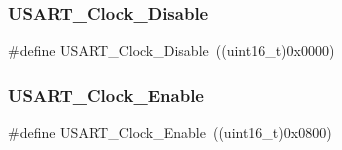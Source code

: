 \subsubsection{\texorpdfstring{USART\_Clock\_Disable}{USART\_Clock\_Disable}}
{\footnotesize\ttfamily \#define U\+S\+A\+R\+T\+\_\+\+Clock\+\_\+\+Disable~((uint16\+\_\+t)0x0000)}

\mbox{\label{group___u_s_a_r_t___clock_gacfe029e2ec4f49ddde031fd031654caa}} 
\subsubsection{\texorpdfstring{USART\_Clock\_Enable}{USART\_Clock\_Enable}}
{\footnotesize\ttfamily \#define U\+S\+A\+R\+T\+\_\+\+Clock\+\_\+\+Enable~((uint16\+\_\+t)0x0800)}

